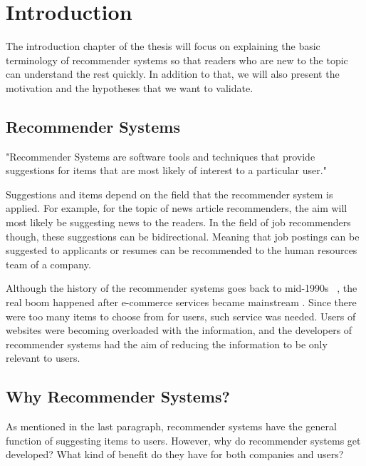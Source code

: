\renewcommand\textbullet{\ensuremath{\bullet}}

\chapter{Introduction}\label{chapter:introduction}

The introduction chapter of the thesis will focus on explaining the basic terminology of recommender systems so that readers who are new to the topic can understand the rest quickly. In addition to that, we will also present the motivation and the hypotheses that we want to validate.

\section{Recommender Systems}

"Recommender Systems are software tools and techniques that provide suggestions for items that are most likely of interest to a particular user." ~\parencite{Ricci2015}

Suggestions and items depend on the field that the recommender system is applied. For example, for the topic of news article recommenders, the aim will most likely be suggesting news to the readers. In the field of job recommenders though, these suggestions can be bidirectional. Meaning that job postings can be suggested to applicants or resumes can be recommended to the human resources team of a company.

Although the history of the recommender systems goes back to mid-1990s ~\parencite{PARK201210059}, the real boom happened after e-commerce services became mainstream \cite{smith2017two}. Since there were too many items to choose from for users, such service was needed. Users of websites were becoming overloaded with the information, and the developers of recommender systems had the aim of reducing the information to be only relevant to users. 

\section{Why Recommender Systems?}

As mentioned in the last paragraph, recommender systems have the general function of suggesting items to users. However, why do recommender systems get developed? What kind of benefit do they have for both companies and users?

